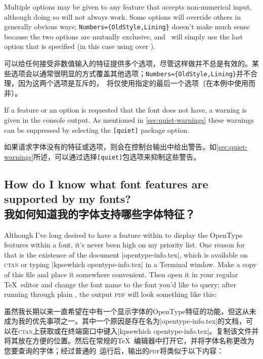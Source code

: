 \documentclass[a4paper]{l3doc}
\begin{document}
Multiple options may be given to
any feature that accepts non-numerical input, although doing so will
not always work. Some options will override others in generally
obvious ways; \Verb|Numbers={OldStyle,Lining}| doesn't make much
sense because the two options are mutually exclusive, and \XeTeX\
will simply use the last option that is specified (in this case
using  over ).

可以给任何接受非数值输入的特征提供多个选项，尽管这样做并不总是有效的。某些选项会以通常很明显的方式覆盖其他选项；\Verb|Numbers={OldStyle,Lining}|并不合理，因为这两个选项是互斥的，\XeTeX\ 将仅使用指定的最后一个选项（在本例中使用而非）。

If a feature or an option is requested that the font does not have,
a warning is given in the console output. As mentioned in \vref{sec:quiet-warnings}
these warnings can be suppressed by selecting the \texttt{[quiet]} package option.

如果请求字体没有的特征或选项，则会在控制台输出中给出警告。如\vref{sec:quiet-warnings}所述，可以通过选择\texttt{[quiet]}包选项来抑制这些警告。

\subsection{How do I know what font features are supported by my fonts?\\我如何知道我的字体支持哪些字体特征？}

Although I've long desired to have a feature within  to display the OpenType features within a font, it's never been high on my priority list.
One reason for that is the existence of the document |opentype-info.tex|, which is available on \textsc{ctan} or typing |kpsewhich opentype-info.tex| in a Terminal window.
Make a copy of this file and place it somewhere convenient.
Then open it in your regular \TeX\ editor and change the font name to the font you'd like to query; after running through plain \XeTeX, the output \textsc{pdf} will look something like this:

虽然我长期以来一直希望在中有一个显示字体的OpenType特征的功能，但这从未成为我的优先事项之一。其中一个原因是存在名为|opentype-info.tex|的文档，可以在\textsc{ctan}上获取或在终端窗口中键入|kpsewhich opentype-info.tex|。复制该文件并将其放在方便的位置。然后在常规的\TeX\ 编辑器中打开它，并将字体名称更改为您要查询的字体；经过普通的\XeTeX\ 运行后，输出的\textsc{pdf}将类似于以下内容：
\end{document}

